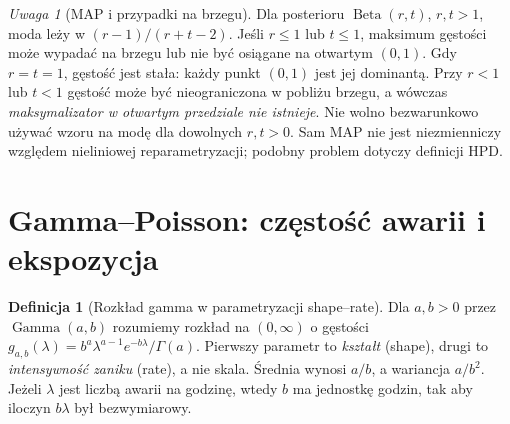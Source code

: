 \documentclass[11pt,a4paper,oneside]{report}
\numberwithin{equation}{chapter}
\theoremstyle{plain}
\theoremstyle{definition}
\newtheorem{definicja}{Definicja}[chapter]
\theoremstyle{remark}
\newtheorem{uwaga}{Uwaga}[chapter]
\begin{document}
\begin{uwaga}[MAP i przypadki na brzegu]
Dla posterioru $\operatorname{Beta}(r,t)$, $r,t>1$,
moda leży w $(r-1)/(r+t-2)$. Jeśli $r\le1$ lub $t\le1$,
maksimum gęstości może wypadać na brzegu lub nie być osiągane
na otwartym $(0,1)$. Gdy $r=t=1$, gęstość jest stała:
każdy punkt $(0,1)$ jest jej dominantą. Przy $r<1$ lub
$t<1$ gęstość może być nieograniczona w pobliżu brzegu,
a wówczas \emph{maksymalizator w otwartym przedziale nie istnieje}.
Nie wolno bezwarunkowo używać wzoru na modę dla dowolnych
$r,t>0$. Sam MAP nie jest niezmienniczy względem nieliniowej
reparametryzacji; podobny problem dotyczy definicji HPD.
\end{uwaga}

\section{Gamma--Poisson: częstość awarii i ekspozycja}
\begin{definicja}[Rozkład gamma w parametryzacji shape--rate]
Dla $a,b>0$ przez $\operatorname{Gamma}(a,b)$ rozumiemy
rozkład na $(0,\infty)$ o gęstości
$g_{a,b}(\lambda)=b^a\lambda^{a-1}e^{-b\lambda}/\Gamma(a)$.
Pierwszy parametr to \emph{kształt} (shape), drugi to
\emph{intensywność zaniku} (rate), a nie skala.
Średnia wynosi $a/b$, a wariancja $a/b^2$.
Jeżeli $\lambda$ jest liczbą awarii na godzinę, wtedy
$b$ ma jednostkę godzin, tak aby iloczyn $b\lambda$
był bezwymiarowy.
\end{definicja}
\end{document}
